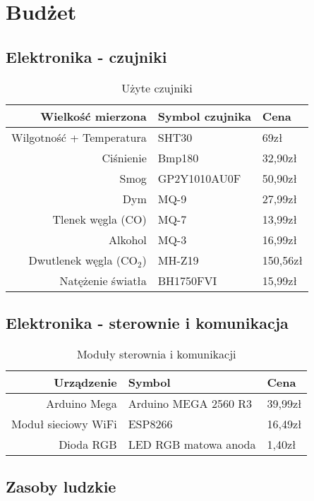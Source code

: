 \documentclass[10pt, a4paper]{article}
\begin{document}
\section{Budżet}
\subsection{Elektronika - czujniki}

\begin{table}[H]
		\centering
		\begin{tabular}{|r|l|l|} \hline
			\textbf{Wielkość mierzona} & \textbf{Symbol czujnika} & \textbf{Cena}\\
			\hline
			Wilgotność + Temperatura & SHT30 & 69zł \\
			Ciśnienie & Bmp180 & 32,90zł\\
			Smog & GP2Y1010AU0F & 50,90zł \\
			Dym & MQ-9 & 27,99zł \\
			Tlenek węgla (CO) & MQ-7 & 13,99zł\\
			Alkohol & MQ-3 & 16,99zł \\
			Dwutlenek węgla (CO$_2$) & MH-Z19 & 150,56zł\\
			Natężenie światła & BH1750FVI & 15,99zł\\ 
			\hline
		\end{tabular}
		\caption{Użyte czujniki}
		\label{tab:Czujniki}
	\end{table}


\subsection{Elektronika - sterownie i komunikacja}

\begin{table}[H]
		\centering
		\begin{tabular}{|r|l|l|} \hline
			\textbf{Urządzenie} & \textbf{Symbol} & \textbf{Cena}\\
			\hline
			Arduino Mega & Arduino MEGA 2560 R3 & 39,99zł \\
			Moduł sieciowy WiFi & ESP8266 & 16,49zł\\
			Dioda RGB & LED RGB matowa anoda & 1,40zł \\ \hline
		\end{tabular}
		\caption{Moduły sterownia i komunikacji}
		\label{tab:Sterowanie}
	\end{table}
	
\subsection{Zasoby ludzkie}
\end{document}
